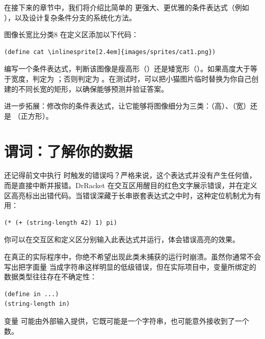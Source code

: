 在接下来的章节中，我们将介绍比简单的  更强大、更优雅的条件表达式（例如 ），以及设计复杂条件分支的系统化方法。

\begin{exercise}{图像长宽比分类}{8}
在定义区添加以下代码：
\begin{stepperbox}
\begin{Verbatim}[commandchars=\\\{\}, fontsize=\footnotesize]
(define cat \inlinesprite[2.4em]{images/sprites/cat1.png})
\end{Verbatim}
\end{stepperbox}

编写一个条件表达式，判断该图像是瘦高形（）还是矮宽形（）。如果高度大于等于宽度，判定为 ；否则判定为 。在测试时，可以把小猫图片临时替换为你自己创建的不同长宽的矩形，以确保能够预测并验证答案。

进一步拓展：修改你的条件表达式，让它能够将图像细分为三类：（高）、（宽）还是 （正方形）。
\end{exercise}


\section{谓词：了解你的数据}
\label{sec:1.7}

还记得前文中执行  时触发的错误吗？严格来说，这个表达式并没有产生任何值，而是直接中断并报错。DrRacket 在交互区用醒目的红色文字展示错误，并在定义区高亮标出出错代码。当错误深藏于长串嵌套表达式之中时，这种定位机制尤为有用：
\begin{lstlisting}[language=BSL]
(* (+ (string-length 42) 1) pi)
\end{lstlisting}
你可以在交互区和定义区分别输入此表达式并运行，体会错误高亮的效果。

在真正的实际程序中，你绝不希望出现此类未捕获的运行时崩溃。虽然你通常不会写出把字面量  当成字符串这样明显的低级错误，但在实际项目中，变量所绑定的数据类型往往存在不确定性：
\begin{lstlisting}[language=BSL]
(define in ...)
(string-length in)
\end{lstlisting}
变量  可能由外部输入提供，它既可能是一个字符串，也可能意外接收到了一个数。


